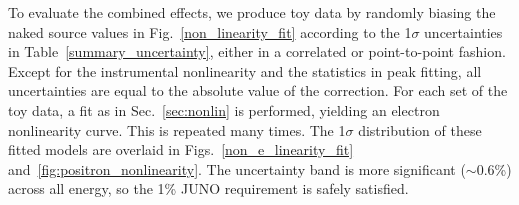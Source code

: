 \documentclass[a4paper,10pt,twoside]{cpc-hepnp}
\begin{document}
\begin{CJK*}{GB}{gbsn}
\begin{multicols}{2}

  To evaluate the combined effects, we produce toy data by randomly
  biasing the naked source values in Fig.~\ref{non_linearity_fit}
  according to the 1$\sigma$ uncertainties in
  Table~\ref{summary_uncertainty}, either in a correlated or
  point-to-point fashion. Except for the instrumental nonlinearity and
  the statistics in peak fitting, 
  all uncertainties are equal to the absolute value of the correction.
  For each set of the toy
  data, a fit as in Sec.~\ref{sec:nonlin} is performed, yielding an
  electron nonlinearity curve. This is repeated many times. The
  1$\sigma$ distribution of these fitted models are overlaid in
  Figs.~\ref{non_e_linearity_fit}
  and~\ref{fig:positron_nonlinearity}. The uncertainty band is more
  significant
  ($\sim$0.6\%)
  across all energy, so the 1\% JUNO requirement is safely satisfied.


\end{multicols}
\end{CJK*}
\end{document}
